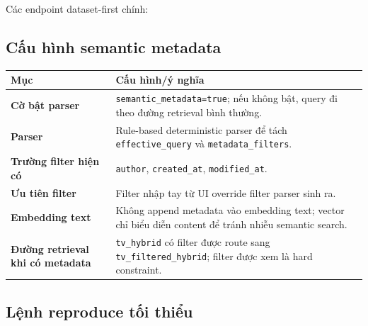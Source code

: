 \documentclass[11pt,a4paper]{article}
\begin{document}
Các endpoint dataset-first chính:

\begin{center}
\end{center}

\subsection{Cấu hình semantic metadata}

\begin{tabularx}{\textwidth}{>{\bfseries}p{} Y}
\toprule
Mục & Cấu hình/ý nghĩa \\
\midrule
Cờ bật parser & \texttt{semantic\_metadata=true}; nếu không bật, query đi theo đường retrieval bình thường. \\
Parser & Rule-based deterministic parser để tách \texttt{effective\_query} và \texttt{metadata\_filters}. \\
Trường filter hiện có & \texttt{author}, \texttt{created\_at}, \texttt{modified\_at}. \\
Ưu tiên filter & Filter nhập tay từ UI override filter parser sinh ra. \\
Embedding text & Không append metadata vào embedding text; vector chỉ biểu diễn content để tránh nhiễu semantic search. \\
Đường retrieval khi có metadata & \texttt{tv\_hybrid} có filter được route sang \texttt{tv\_filtered\_hybrid}; filter được xem là hard constraint. \\
\bottomrule
\end{tabularx}

\subsection{Lệnh reproduce tối thiểu}
\end{document}
